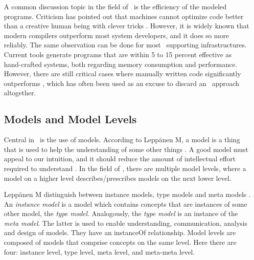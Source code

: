 A common discussion topic in the field of \mde~is the efficiency of the modeled programs. Criticism has pointed out that machines cannot optimize code better than a creative human being with clever tricks \cite{Selic2003-qa}. However, it is widely known that modern compilers outperform most system developers, and it does so more reliably. The same observation can be done for most \mdd~supporting infrastructures. Current tools generate programs that are within 5 to 15 percent effective as hand-crafted systems, both regarding memory consumption and performance. However, there are still critical cases where manually written code significantly outperforms \mde, which has often been used as an excuse to discard an \mdd~approach altogether.

\subsection{Models and Model Levels}
\label{sub:Models and Model Levels}
Central in \mde~is the use of models. According to Leppänen M, a model is a thing that is used to help the understanding of some other things \cite{Leppanen2006-ay}. A good model must appeal to our intuition, and it should reduce the amount of intellectual effort required to understand \cite{Selic2003-qa}. In the field of \mdd, there are multiple model levels, where a model on a higher level describes/prescribes models on the next lower level. 

Leppänen M distinguish between instance models, type models and meta models \cite{Leppanen2006-ay}. An \textit{instance model} is a model which contains concepts that are instances of some other model, the \textit{type model}. Analogously, the \textit{type model} is an instance of the \textit{meta model}. The latter is used to enable understanding, communication, analysis and design of models. They have an instanceOf relationship. Model levels are composed of models that comprise concepts on the same level. Here there are four: instance level, type level, meta level, and meta-meta level.

